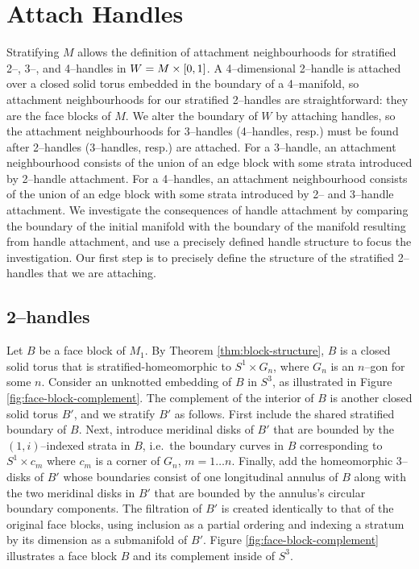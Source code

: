 \section{Attach Handles}

Stratifying $M$ allows the definition of attachment neighbourhoods for stratified 2--, 3--, and 4--handles in $W=M\times[0,1]$.
A 4--dimensional 2--handle is attached over a closed solid torus embedded in the boundary of a 4--manifold, so attachment neighbourhoods for our stratified 2--handles are straightforward: they are the face blocks of $M$.
We alter the boundary of $W$ by attaching handles, so the attachment neighbourhoods for 3--handles (4--handles, resp.) must be found after 2--handles (3--handles, resp.) are attached.
For a 3--handle, an attachment neighbourhood consists of the union of an edge block with some strata introduced by 2--handle attachment.
For a 4--handles, an attachment neighbourhood consists of the union of an edge block with some strata introduced by 2-- and 3--handle attachment.
We investigate the consequences of handle attachment by comparing the boundary of the initial manifold with the boundary of the manifold resulting from handle attachment, and use a precisely defined handle structure to focus the investigation.
Our first step is to precisely define the structure of the stratified 2--handles that we are attaching.

\subsection{2--handles}

Let $B$ be a face block of $M_1$.
By Theorem \ref{thm:block-structure}, $B$ is a closed solid torus that is stratified-homeomorphic to $S^1\times G_n$, where $G_n$ is an $n$--gon for some $n$.
Consider an unknotted embedding of $B$ in $S^3$, as illustrated in Figure \ref{fig:face-block-complement}.
The complement of the interior of $B$ is another closed solid torus $B'$, and we stratify $B'$ as follows.
First include the shared stratified boundary of $B$.
Next, introduce meridinal disks of $B'$ that are bounded by the $(1,i)$--indexed strata in $B$, i.e.\ the boundary curves in $B$ corresponding to $S^1\times c_m$ where $c_m$ is a corner of $G_n$, $m=1\dots n$.
Finally, add the homeomorphic 3--disks of $B'$ whose boundaries consist of one longitudinal annulus of $B$ along with the two meridinal disks in $B'$ that are bounded by the annulus's circular boundary components.
The filtration of $B'$ is created identically to that of the original face blocks, using inclusion as a partial ordering and indexing a stratum by its dimension as a submanifold of $B'$.
Figure \ref{fig:face-block-complement} illustrates a face block $B$ and its complement inside of $S^3$.

